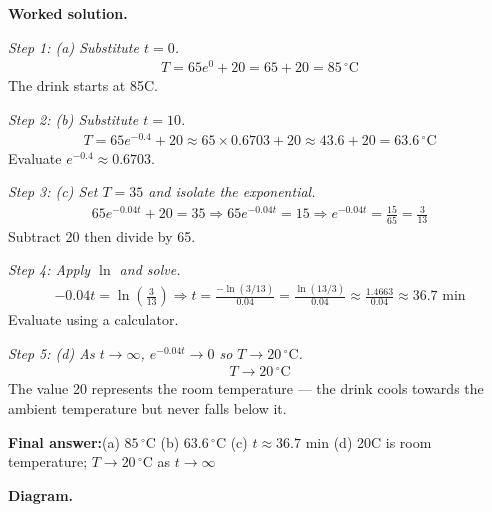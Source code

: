 \documentclass[11pt]{article}
\begin{document}
\textbf{Worked solution.}

\textit{Step 1: (a) Substitute \( t = 0 \).}
\[\begin{gathered}
T = 65e^0 + 20 = 65 + 20 = 85\,^\circ\!\text{C}
\end{gathered}\]
The drink starts at 85\textdegree C.

\textit{Step 2: (b) Substitute \( t = 10 \).}
\[\begin{gathered}
T = 65e^{-0.4} + 20 \approx 65 \times 0.6703 + 20 \approx 43.6 + 20 = 63.6\,^\circ\!\text{C}
\end{gathered}\]
Evaluate \( e^{-0.4} \approx 0.6703 \).

\textit{Step 3: (c) Set \( T = 35 \) and isolate the exponential.}
\[\begin{gathered}
65e^{-0.04t} + 20 = 35 \Rightarrow 65e^{-0.04t} = 15 \Rightarrow e^{-0.04t} = \frac{15}{65} = \frac{3}{13}
\end{gathered}\]
Subtract 20 then divide by 65.

\textit{Step 4: Apply \( \ln \) and solve.}
\[\begin{gathered}
-0.04t = \ln\!\left(\frac{3}{13}\right) \Rightarrow t = \frac{-\ln(3/13)}{0.04} = \frac{\ln(13/3)}{0.04} \approx \frac{1.4663}{0.04} \approx 36.7 \text{ min}
\end{gathered}\]
Evaluate using a calculator.

\textit{Step 5: (d) As \( t \to \infty \), \( e^{-0.04t} \to 0 \) so \( T \to 20\,^\circ\!\text{C} \).}
\[\begin{gathered}
T \to 20\,^\circ\!\text{C}
\end{gathered}\]
The value 20 represents the room temperature --- the drink cools towards the ambient temperature but never falls below it.

\begin{answerbox}
\textbf{Final answer:}\quad (a) \(\displaystyle  85\,^\circ\!\text{C} \) \quad  (b) \(\displaystyle  63.6\,^\circ\!\text{C} \) \quad  (c) \(\displaystyle  t \approx 36.7 \) min \quad  (d) 20\textdegree C is room temperature; \(\displaystyle  T \to 20\,^\circ\!\text{C} \) as \(\displaystyle  t \to \infty \)
\end{answerbox}
\textbf{Diagram.}
\end{document}
